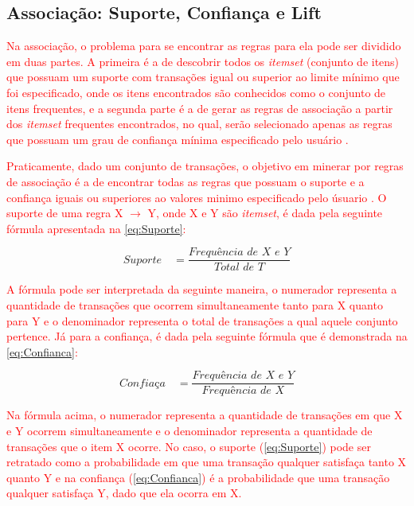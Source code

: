 \subsection{Associação: Suporte, Confiança e Lift}

\par
\textcolor{red}{Na associação, o problema para se encontrar as regras para ela pode ser dividido em duas partes. A primeira é a de descobrir todos os \textit{itemset} (conjunto de itens) que possuam um suporte com transações igual ou superior ao limite mínimo que foi especificado, onde os itens encontrados são conhecidos como o conjunto de itens frequentes, e a segunda parte é a de gerar as regras de associação a partir dos \textit{itemset} frequentes encontrados, no qual, serão selecionado apenas as regras que possuam um grau de confiança mínima especificado pelo usuário \cite{Vasconcelos2004, LeandroSilva2014}.}

\textcolor{red}{Praticamente, dado um conjunto de transações, o objetivo em minerar por regras de associação é a de encontrar todas as regras que possuam o suporte e a confiança iguais ou superiores ao valores minimo especificado pelo úsuario \cite{Vasconcelos2004}. O suporte de uma regra X $\rightarrow$ Y, onde X e Y são  \textit{itemset}, é dada pela seguinte fórmula apresentada na \autoref{eq:Suporte}:}


\begin{equation}
    \label{eq:Suporte}
        {\textit{Suporte}\quad =\frac { \textit{Frequência de X e Y} }{ \textit{Total de T}} }
\end{equation}

\par
\textcolor{red}{A fórmula pode ser interpretada da seguinte maneira, o numerador representa a quantidade de transações que ocorrem simultaneamente tanto para X quanto para Y e o denominador representa o total de transações a qual aquele conjunto pertence. Já para a confiança, é dada pela seguinte fórmula que é demonstrada na \autoref{eq:Confianca}:}

\begin{equation}
    \label{eq:Confianca}
        {\textit{Confiaça}\quad =\frac { \textit{Frequência de X e Y} }{ \textit{Frequência de X}} }
\end{equation}

\par
\textcolor{red}{Na fórmula acima, o numerador representa a quantidade de transações em que X e Y ocorrem simultaneamente e o denominador representa a quantidade de transações que o item X ocorre. No caso, o suporte (\autoref{eq:Suporte}) pode ser retratado como a probabilidade em que uma transação qualquer satisfaça tanto X quanto Y e na confiança (\autoref{eq:Confianca}) é a probabilidade que uma transação qualquer satisfaça Y, dado que ela ocorra em X.}

